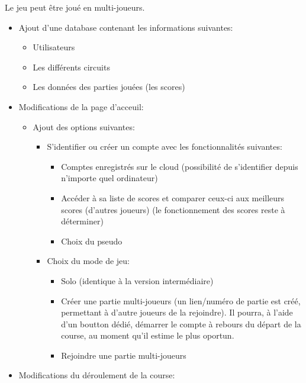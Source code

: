 \documentclass{article}
\begin{document}
Le jeu peut être joué en multi-joueurs.
\begin{itemize}
    \item Ajout d'une database contenant les informations suivantes: \begin{itemize}
              \item Utilisateurs
              \item Les différents circuits
              \item Les données des parties jouées (les scores)
          \end{itemize}
    \item Modifications de la page d'acceuil: \begin{itemize}
              \item Ajout des options suivantes: \begin{itemize}
                        \item S'identifier ou créer un compte avec les fonctionnalités suivantes: \begin{itemize}
                                  \item Comptes enregistrés sur le cloud (possibilité de s'identifier depuis n'importe quel ordinateur)
                                  \item Accéder à sa liste de scores et comparer ceux-ci aux meilleurs scores (d'autres joueurs) (le fonctionnement des scores reste à déterminer)
                                  \item Choix du pseudo
                              \end{itemize}
                        \item Choix du mode de jeu: \begin{itemize}
                                  \item Solo (identique à la version intermédiaire)
                                  \item Créer une partie multi-joueurs (un lien/numéro de partie est créé, permettant à d'autre joueurs de la rejoindre). Il pourra, à l'aide d'un boutton dédié, démarrer le compte à rebours du départ de la course, au moment qu'il estime le plus oportun.
                                  \item Rejoindre une partie multi-joueurs
                              \end{itemize}
                    \end{itemize}
          \end{itemize}
    \item Modifications du déroulement de la course: \begin{itemize}

\end{itemize}
\end{itemize}
\end{document}
